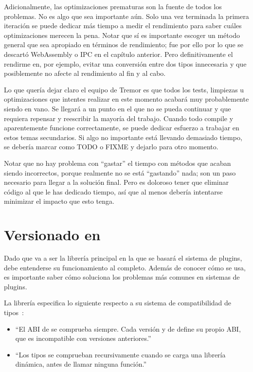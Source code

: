 Adicionalmente, las optimizaciones prematuras son la fuente de todos los
problemas. No es algo que sea importante aún. Solo una vez terminada la primera
iteración se puede dedicar más tiempo a medir el rendimiento para saber cuáles
optimizaciones merecen la pena. Notar que sí es importante escoger un método
general que sea apropiado en términos de rendimiento; fue por ello por lo que se
descartó WebAssembly o IPC en el capítulo anterior. Pero definitivamente el
rendirme en, por ejemplo, evitar una conversión entre dos tipos innecesaria y
que posiblemente no afecte al rendimiento al fin y al cabo.

Lo que quería dejar claro el equipo de Tremor es que todos los tests, limpiezas
u optimizaciones que intentes realizar en este momento acabará muy probablemente
siendo en vano. Se llegará a un punto en el que no se pueda continuar y que
requiera repensar y reescribir la mayoría del trabajo. Cuando todo compile y
aparentemente funcione correctamente, se puede dedicar esfuerzo a trabajar en
estos temas secundarios. Si algo no importante está llevando demasiado tiempo,
se debería marcar como TODO o FIXME y dejarlo para otro momento.

Notar que no hay problema con ``gastar'' el tiempo con métodos que acaban siendo
incorrectos, porque realmente no se está ``gastando'' nada; son un paso
necesario para llegar a la solución final. Pero es doloroso tener que eliminar
código al que le has dedicado tiempo, así que al menos debería intentarse
minimizar el impacto que esto tenga.

\section{Versionado en \abistable}

Dado que \abistable va a ser la librería principal en la que se basará el
sistema de plugins, debe entenderse su funcionamiento al completo. Además de
conocer cómo se usa, es importante saber cómo soluciona los problemas más
comunes en sistemas de plugins.

La librería especifica lo siguiente respecto a su sistema de compatibilidad de
tipos~\cite{abistable_safety}:

\begin{itemize}
    \item ``El ABI de \abistable se comprueba siempre. Cada versión 
        y  de \abistable define su propio ABI, que es incompatible
        con versiones anteriores.''

    \item ``Los tipos se comprueban recursivamente cuando se carga una librería
        dinámica, antes de llamar ninguna función.''

\end{itemize}


